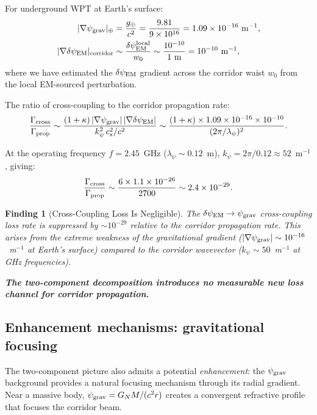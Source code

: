 \documentclass[11pt]{article}
\newtheorem{finding}{Finding}
\newcommand{\ee}[1]{\times 10^{#1}}
\newcommand{\psigrav}{\psi_{\rm grav}}
\newcommand{\dpsiEM}{\delta\psi_{\rm EM}}
\newcommand{\GN}{G_N}
\begin{document}
For underground WPT at Earth's surface:
\begin{align}
|\nabla\psigrav|_\oplus &= \frac{g_\oplus}{c^2} = \frac{9.81}{9\ee{16}}
= 1.09\ee{-16}~\text{m}^{-1}, \\
|\nabla\dpsiEM|_{\rm corridor} &\sim \frac{\dpsiEM^{\rm local}}{w_0}
\sim \frac{10^{-10}}{1~\text{m}} = 10^{-10}~\text{m}^{-1},
\label{eq:grad-dpsi-corridor}
\end{align}
where we have estimated the $\dpsiEM$ gradient across the corridor waist $w_0$
from the local EM-sourced perturbation.

The ratio of cross-coupling to the corridor propagation rate:
\begin{equation}
\frac{\Gamma_{\rm cross}}{\Gamma_{\rm prop}}
\sim \frac{(1+\kappa)\,|\nabla\psigrav|\,|\nabla\dpsiEM|}
{k_\psi^2\,c_s^2/c^2}
\sim \frac{(1+\kappa)\times 1.09\ee{-16}\times 10^{-10}}
{(2\pi/\lambda_\psi)^2}.
\label{eq:cross-to-prop}
\end{equation}

At the operating frequency $f = 2.45$~GHz ($\lambda_\psi \sim 0.12$~m),
$k_\psi = 2\pi/0.12 \approx 52$~m$^{-1}$, giving:
\begin{equation}
\frac{\Gamma_{\rm cross}}{\Gamma_{\rm prop}}
\sim \frac{6\times 1.1\ee{-26}}{2700} \sim 2.4\ee{-29}.
\label{eq:cross-ratio}
\end{equation}

\begin{finding}[Cross-Coupling Loss Is Negligible]
\label{find:cross-coupling}
The $\dpsiEM \to \psigrav$ cross-coupling loss rate is suppressed by
$\sim 10^{-29}$ relative to the corridor propagation rate. This arises
from the extreme weakness of the gravitational gradient ($|\nabla\psigrav|
\sim 10^{-16}$~m$^{-1}$ at Earth's surface) compared to the corridor
wavevector ($k_\psi \sim 50$~m$^{-1}$ at GHz frequencies).

\textbf{The two-component decomposition introduces no measurable new loss
channel for corridor propagation.}
\end{finding}

\subsection{Enhancement mechanisms: gravitational focusing}

The two-component picture also admits a potential \emph{enhancement}:
the $\psigrav$ background provides a natural focusing mechanism through
its radial gradient. Near a massive body, $\psigrav = \GN M/(c^2 r)$
creates a convergent refractive profile that focuses the corridor beam.
\end{document}
